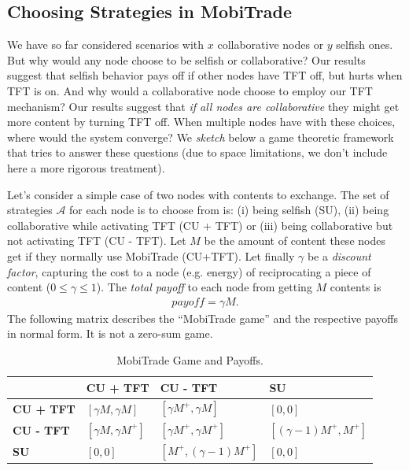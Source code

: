 \subsection{Choosing Strategies in MobiTrade}
\label{game}

We have so far considered scenarios with $x$ collaborative nodes or $y$ selfish ones. But why would any node choose to be selfish or collaborative? Our results suggest that selfish behavior pays off if other nodes have TFT off, but hurts when TFT is on. And why would a collaborative node choose to employ our TFT mechanism? Our results suggest that \emph{if all nodes are collaborative} they might get more content by turning TFT off. When multiple nodes have with these choices, where would the system converge? We \emph{sketch} below a game theoretic framework that tries to answer these questions (due to space limitations, we don't include here a more rigorous treatment).

Let's consider a simple case of two nodes with contents to exchange. The set of strategies $\mathcal{A}$ for each node is to choose from is: (i) being selfish (SU), (ii) being collaborative while activating TFT (CU + TFT) or (iii) being collaborative but not activating TFT (CU - TFT). Let $M$ be the amount of content these nodes get if they normally use MobiTrade (CU+TFT). Let finally $\gamma$ be a \emph{discount factor}, capturing the cost to a node (e.g. energy) of reciprocating a piece of content ($ 0 \le \gamma \le 1$).  The \emph{total payoff} to each node from getting $M$ contents is
\begin{eqnarray*}
payoff = \gamma M.
\end{eqnarray*}
The following matrix describes the ``MobiTrade game'' and the respective payoffs in normal form. It is not a zero-sum game.

\begin{table}[!h]
\caption{MobiTrade Game and Payoffs.}
\centering
\label{table:game}
\footnotesize
\begin{tabular}{|p{2cm}|p{2cm}|p{3cm}|p{3cm}|}
\hline
\bfseries & \bfseries CU + TFT & \bfseries CU - TFT  & \bfseries SU\\
\hline
\bfseries CU + TFT & $[\gamma M, \gamma M]$ & $[\gamma M^{+}, \gamma M]$ & $[0,0]$\\
\hline
\bfseries CU - TFT & $[\gamma M, \gamma M^{+}]$ & $[\gamma M^{+}, \gamma M^{+}]$ &$[(\gamma - 1) M^{+}, M^{+} ]$ \\
\hline
\bfseries SU &$[0, 0]$ &$[ M^{+}, (\gamma - 1) M^{+}]$ & $[0, 0]$\\
\hline
\end{tabular}
\end{table}

